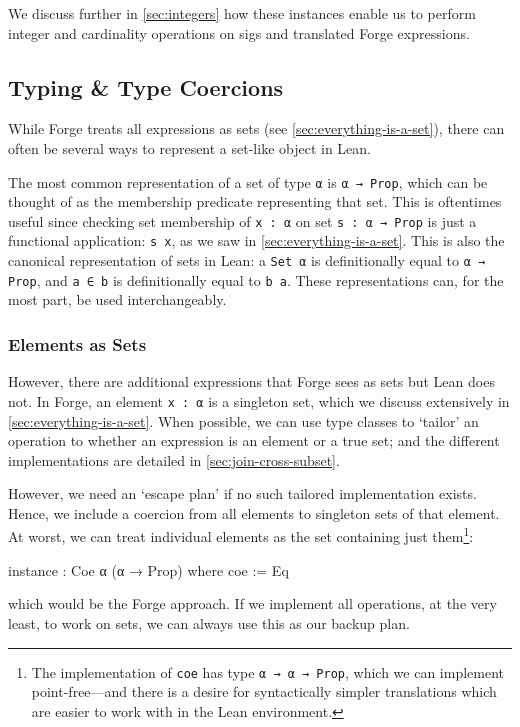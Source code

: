 We discuss further in \cref{sec:integers} how these instances enable us to perform integer and cardinality operations on sigs and translated Forge expressions. 

\subsection{Typing \& Type Coercions}\label{sec:type-coercions}
While Forge treats all expressions as sets (see \cref{sec:everything-is-a-set}), there can often be several ways to represent a set-like object in Lean. 

The most common representation of a set of type \texttt{α} is \texttt{α → Prop}, which can be thought of as the membership predicate representing that set. This is oftentimes useful since checking set membership of \texttt{x : α} on set \texttt{s : α → Prop} is just a functional application: \texttt{s x}, as we saw in \cref{sec:everything-is-a-set}. This is also the canonical representation of sets in Lean: a \texttt{Set α} is definitionally equal to \texttt{α → Prop}, and \texttt{a ∈ b} is definitionally equal to \texttt{b a}. These representations can, for the most part, be used interchangeably. 

\subsubsection{Elements as Sets}

However, there are additional expressions that Forge sees as sets but Lean does not. In Forge, an element \texttt{x : α} is a singleton set, which we discuss extensively in \cref{sec:everything-is-a-set}. When possible, we can use type classes to `tailor' an operation to whether an expression is an element or a true set; and the different implementations are detailed in \cref{sec:join-cross-subset}. 

However, we need an `escape plan' if no such tailored implementation exists. Hence, we include a coercion from all elements to singleton sets of that element. At worst, we can treat individual elements as the set containing just them\footnote{The implementation of \texttt{coe} has type \texttt{α → α → Prop}, which we can implement point-free---and there is a desire for syntactically simpler translations which are easier to work with in the Lean environment.}: 
\begin{leanimpl*}
instance : Coe α (α → Prop) where
  coe := Eq
\end{leanimpl*}
which would be the Forge approach. If we implement all operations, at the very least, to work on sets, we can always use this as our backup plan. 

